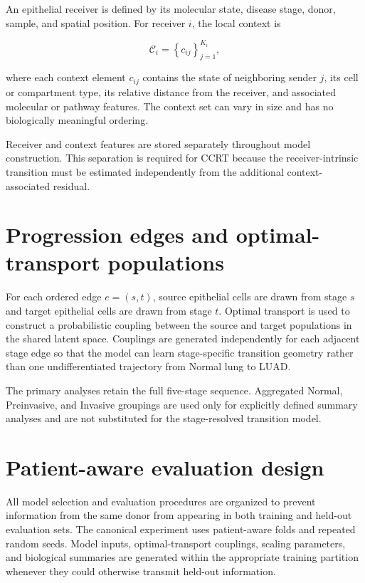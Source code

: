 An epithelial receiver is defined by its molecular state, disease stage, donor, sample, and spatial position. For receiver $i$, the local context is

\begin{equation}
\mathcal{C}_i = \left\{c_{ij}\right\}_{j=1}^{K_i},
\end{equation}

where each context element $c_{ij}$ contains the state of neighboring sender $j$, its cell or compartment type, its relative distance from the receiver, and associated molecular or pathway features. The context set can vary in size and has no biologically meaningful ordering.

Receiver and context features are stored separately throughout model construction. This separation is required for CCRT because the receiver-intrinsic transition must be estimated independently from the additional context-associated residual.

\section{Progression edges and optimal-transport populations}

For each ordered edge $e=(s,t)$, source epithelial cells are drawn from stage $s$ and target epithelial cells are drawn from stage $t$. Optimal transport is used to construct a probabilistic coupling between the source and target populations in the shared latent space. Couplings are generated independently for each adjacent stage edge so that the model can learn stage-specific transition geometry rather than one undifferentiated trajectory from Normal lung to LUAD.

The primary analyses retain the full five-stage sequence. Aggregated Normal, Preinvasive, and Invasive groupings are used only for explicitly defined summary analyses and are not substituted for the stage-resolved transition model.

\section{Patient-aware evaluation design}

All model selection and evaluation procedures are organized to prevent information from the same donor from appearing in both training and held-out evaluation sets. The canonical experiment uses patient-aware folds and repeated random seeds. Model inputs, optimal-transport couplings, scaling parameters, and biological summaries are generated within the appropriate training partition whenever they could otherwise transmit held-out information.


